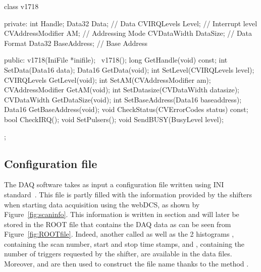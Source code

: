 	\begin{code}
    \begin{cppcode}
class v1718{
    private:
        int               Handle;
        Data32            Data;           // Data
        CVIRQLevels       Level;          // Interrupt level
        CVAddressModifier AM;             // Addressing Mode
        CVDataWidth       DataSize;       // Data Format
        Data32            BaseAddress;    // Base Address

    public:
        v1718(IniFile *inifile);
        ~v1718();
        long              GetHandle(void) const;
        int               SetData(Data16 data);
        Data16            GetData(void);
        int               SetLevel(CVIRQLevels level);
        CVIRQLevels       GetLevel(void);
        int               SetAM(CVAddressModifier am);
        CVAddressModifier GetAM(void);
        int               SetDatasize(CVDataWidth datasize);
        CVDataWidth       GetDataSize(void);
        int               SetBaseAddress(Data16 baseaddress);
        Data16            GetBaseAddress(void);
        void              CheckStatus(CVErrorCodes status) const;
        bool              CheckIRQ();
        void              SetPulsers();
        void              SendBUSY(BusyLevel level);
};
    \end{cppcode}
	\label{cpp:v1718}
	\vspace{5mm}
    \end{code}

    \subsection{Configuration file}
    \label{app1:ssec:inifile}
    
    The DAQ software takes as input a configuration file written using INI standard~\cite{INI}. This file is partly filled with the information provided by the shifters when starting data acquisition using the webDCS, as shown by Figure~\ref{fig:scaninfo}. This information is written in section \iniinline{[General]} and will later be stored in the ROOT file that contains the DAQ data as can be seen from Figure~\ref{fig:ROOTfile}. Indeed, another  called  as well as the 2 histograms , containing the scan number, start and stop time stamps, and , containing the number of triggers requested by the shifter, are available in the data files. Moreover,  and  are then used to construct the file name thanks to the method .
    
